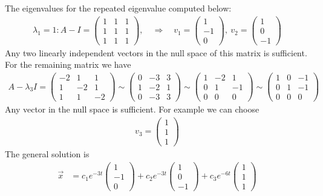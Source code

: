 \ifnum {} {\color{DarkBlue} The eigenvalues for the repeated eigenvalue computed below:
\begin{align}
    \lambda_1 = 1: A - I = \begin{pmatrix} 1&1&1 \\1&1&1\\1&1&1\end{pmatrix}, \quad \Rightarrow \quad v_1 = \begin{pmatrix} 1\\-1\\0\end{pmatrix}, \ v_2 = \begin{pmatrix} 1\\0\\-1\end{pmatrix}
\end{align}
Any two linearly independent vectors in the null space of this matrix is sufficient.  For the remaining matrix we have
\begin{align}
    A - \lambda_3I = \begin{pmatrix} -2&1&1\\1&-2&1\\1&1&-2\end{pmatrix} \sim  \begin{pmatrix} 0&-3&3  \\1&-2&1\\0&-3&3\end{pmatrix}\sim  \begin{pmatrix} 1&-2&1\\0&1&-1\\0&0&0\end{pmatrix}\sim  \begin{pmatrix} 1&0&-1\\0&1&-1\\0&0&0\end{pmatrix} 
\end{align}
Any vector in the null space is sufficient. For example we can choose
\begin{align}
    v_3 = \begin{pmatrix} 1\\1\\1\end{pmatrix}
\end{align}
The general solution is
\begin{align}
    \vec x &= 
    c_1e^{-3t}\begin{pmatrix} 1\\-1\\0\end{pmatrix}
    +c_2 e^{-3t}\begin{pmatrix} 1\\0\\-1\end{pmatrix}
    +c_3 e^{-6t}\begin{pmatrix} 1\\1\\1\end{pmatrix}
\end{align}
} 
\else 
\vspace{3cm}
\fi
\fi



